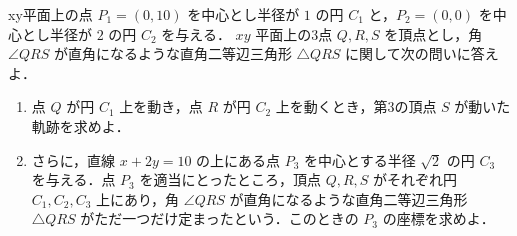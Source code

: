 \documentclass[../../main.tex]{subfiles}
\begin{document}
xy平面上の点 $P_1 = (0, 10)$ を中心とし半径が $1$ の円 $C_1$ と，$P_2 = (0, 0)$ を中心とし半径が $2$ の円 $C_2$ を与える．
$xy$ 平面上の3点 $Q, R, S$ を頂点とし，角 $\angle QRS$ が直角になるような直角二等辺三角形 $\triangle QRS$ に関して次の問いに答えよ．

\begin{enumerate}
  \item 点 $Q$ が円 $C_1$ 上を動き，点 $R$ が円 $C_2$ 上を動くとき，第3の頂点 $S$ が動いた軌跡を求めよ．
  \item さらに，直線 $x + 2y = 10$ の上にある点 $P_3$ を中心とする半径 $\sqrt{2}$ の円 $C_3$ を与える．点 $P_3$ を適当にとったところ，頂点 $Q, R, S$ がそれぞれ円 $C_1, C_2, C_3$ 上にあり，角 $\angle QRS$ が直角になるような直角二等辺三角形 $\triangle QRS$ がただ一つだけ定まったという．このときの $P_3$ の座標を求めよ．
\end{enumerate}
\end{document}
